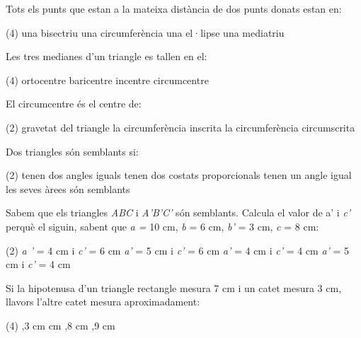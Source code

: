 \pagebreak
\begin{autoaval}{50}
\begin{mylist}
\exer[2]  Tots els punts que estan a la mateixa distància de dos punts donats estan en:

\begin{tasks}(4)
	\task  una bisectriu   
	\task  una circumferència   
	\task  una el·lipse   
	\task  una mediatriu 
\end{tasks}

\exer  Les tres medianes d'un triangle es tallen en el:

\begin{tasks}(4)
	\task  ortocentre   
	\task  baricentre   
	\task  incentre   
	\task  circumcentre 
\end{tasks}


\exer  El circumcentre és el centre de:

\begin{tasks}(2)
	\task  gravetat del triangle  
	\task  la circumferència inscrita   
	\task  la circumferència  circumscrita 
\end{tasks}


\exer  Dos triangles són semblants si:

\begin{tasks}(2)
	\task  tenen dos angles iguals    
	\task  tenen dos costats proporcionals
	\task  tenen un angle igual    
	\task  les seves àrees són semblants
\end{tasks}


\exer  Sabem que els triangles \textit{ABC} i \textit{A'B'C'} són semblants. Calcula el valor de a'  i \textit{c'} perquè el siguin, sabent que \textit{a =} 10 cm, \textit{b} = 6 cm, \textit{b'} = 3 cm, \textit{c} = 8 cm: 

\begin{tasks}(2)
	\task  \textit{a '} = 4 cm i \textit{c'} = 6 cm    
	\task  \textit{a'} = 5 cm i \textit{c'} = 6 cm 
	\task  \textit{a'} = 4 cm i \textit{c'} = 4 cm    
	\task  \textit{a'} = 5 cm i \textit{c'} = 4 cm
\end{tasks}


\exer  Si la hipotenusa d'un triangle rectangle mesura 7 cm i un catet mesura 3 cm, llavors l'altre catet mesura aproximadament:

\begin{tasks}(4)
	,3 cm    
	 cm    
	,8 cm   
	,9 cm
\end{tasks}



\end{mylist}
\end{autoaval}
